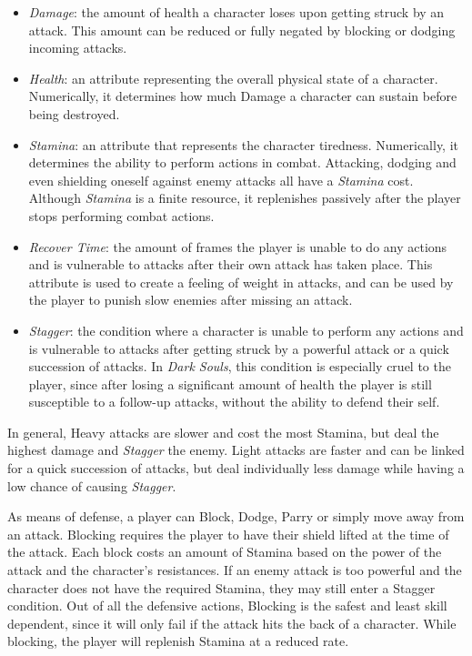 \documentclass[cic,tc,english]{iiufrgs}
\begin{document}
\begin{itemize}

\item \emph{Damage}: the amount of health a character loses upon getting struck by an attack. This amount can be reduced or fully negated by blocking or dodging incoming attacks.

\item \emph{Health}: an attribute representing the overall physical state of a character. Numerically, it determines how much Damage a character can sustain before being destroyed.

\item \emph{Stamina}: an attribute that represents the character tiredness. Numerically, it determines the ability to perform actions in combat. Attacking, dodging and even shielding oneself against enemy attacks all have a \emph{Stamina} cost. Although \emph{Stamina} is a finite resource, it replenishes passively after the player stops performing combat actions.

\item \emph{Recover Time}: the amount of frames the player is unable to do any actions and is vulnerable to attacks after their own attack has taken place. This attribute is used to create a feeling of weight in attacks, and can be used by the player to punish slow enemies after missing an attack.

\item \emph{Stagger}: the condition where a character is unable to perform any actions and is vulnerable to attacks after getting struck by a powerful attack or a quick succession of attacks. In \emph{Dark Souls}, this condition is especially cruel to the player, since after losing a significant amount of health the player is still susceptible to a follow-up attacks, without the ability to defend their self.

\end{itemize}

In general, Heavy attacks are slower and cost the most Stamina, but deal the highest damage and \emph{Stagger} the enemy. Light attacks are faster and can be linked for a quick succession of attacks, but deal individually less damage while having a low chance of causing \emph{Stagger}.

As means of defense, a player can Block, Dodge, Parry or simply move away from an attack. Blocking requires the player to have their shield lifted at the time of the attack. Each block costs an amount of Stamina based on the power of the attack and the character's resistances. If an enemy attack is too powerful and the character does not have the required Stamina, they may still enter a Stagger condition. Out of all the defensive actions, Blocking is the safest and least skill dependent, since it will only fail if the attack hits the back of a character. While blocking, the player will replenish Stamina at a reduced rate.
\end{document}
